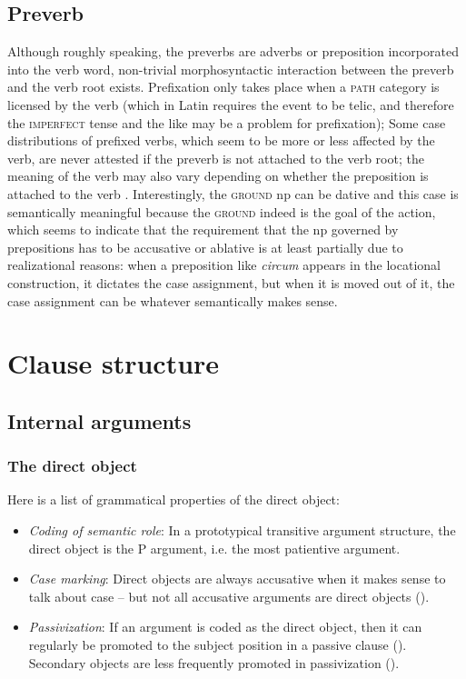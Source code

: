 \documentclass[a4paper, oneside, 12pt]{report}
\newcommand{\form}[1]{\emph{#1}}
\newcommand*{\category}[1]{\textsc{#1}}
\begin{document}
\section{Preverb}

Although roughly speaking, the preverbs are adverbs or preposition 
incorporated into the verb word, 
non-trivial morphosyntactic interaction between the preverb and the verb root exists.
Prefixation only takes place when a \category{path} category is licensed by the verb 
(which in Latin requires the event to be telic, 
and therefore the \category{imperfect} tense and the like may be a problem for prefixation);
Some case distributions of prefixed verbs,
which seem to be more or less affected by the verb, 
are never attested if the preverb is not attached to the verb root; 
the meaning of the verb may also vary depending on whether the preposition is attached to the verb 
\citep{mare2018issues}.
Interestingly, the \category{ground} \acs{np} can be dative 
and this case is semantically meaningful because the \category{ground} indeed is the goal of the action,
which seems to indicate that the requirement that 
the \acs{np} governed by prepositions has to be accusative or ablative
is at least partially due to realizational reasons: 
when a preposition like \form{circum} appears in the locational construction, 
it dictates the case assignment, 
but when it is moved out of it,
the case assignment can be whatever semantically makes sense.

\chapter{Clause structure}


\section{Internal arguments}

\subsection{The direct object}\label{sec:vp.complement.direct-object}

Here is a list of grammatical properties of the direct object:
\begin{itemize}
    \item \emph{Coding of semantic role}: In a prototypical transitive argument structure, 
    the direct object is the P argument, i.e. the most patientive argument. 

    \item \emph{Case marking}: Direct objects are always accusative when it makes sense to talk about case -- 
    but not all accusative arguments are direct objects ().
    \item \emph{Passivization}: If an argument is coded as the direct object, 
    then it can regularly be promoted to the subject position in a passive clause (). 
    Secondary objects are less frequently promoted in passivization ().
\end{itemize}
\end{document}

